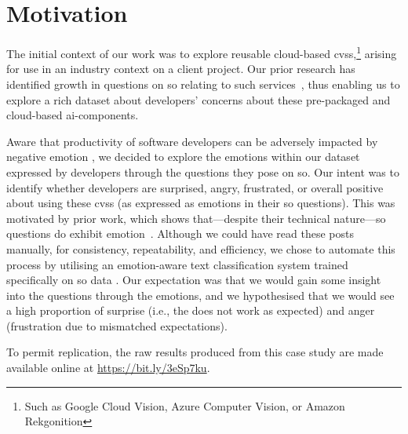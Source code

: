 \section{Motivation}\label{caise2021:sec:study}

The initial context of our work was to explore reusable cloud-based \glspl{cvs},\footnote{Such as Google Cloud Vision, Azure Computer Vision, or Amazon Rekgonition} arising for use in an industry context on a client project. Our prior research has identified growth in questions on \gls{so} relating to such services~\citep{Cummaudo:2020icse}, thus enabling us to explore a rich dataset about developers' concerns about these pre-packaged and cloud-based \gls{ai}-components.

Aware that productivity of software developers can be adversely impacted by negative emotion \citep{wrobel2013}, we decided to explore the emotions within our dataset expressed by developers through the questions they pose on \gls{so}. Our intent was to identify whether developers are surprised, angry, frustrated, or overall positive about using these \glspl{cvs} (as expressed as emotions in their \gls{so} questions). This was motivated by prior work,  which shows that---despite their technical nature---\gls{so} questions do exhibit emotion~\citep{Novielli:2015vda, calefato2017}.  Although we could have read these posts manually, for consistency, repeatability, and efficiency, we chose to automate this process by utilising an emotion-aware text classification system trained specifically on \gls{so} data \citep{novielli2018}. Our expectation was that we would gain some insight into the questions through the emotions, and we hypothesised that we would see a high proportion of surprise (i.e., the  does not work as expected) and anger (frustration due to mismatched expectations).


To permit replication, the raw results produced from this case study are made available online at \url{https://bit.ly/3eSp7ku}.

